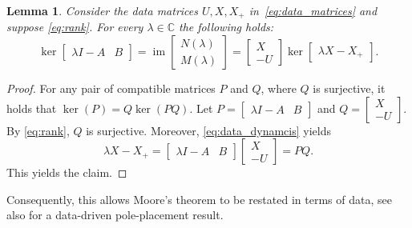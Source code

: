 \documentclass[11pt]{article}
\theoremstyle{plain}
\newtheorem{lemma}[theorem]{Lemma}
\theoremstyle{definition}
\theoremstyle{remark}
\begin{document}
\begin{lemma}
    \label{lem:data_kernel}
    Consider the data matrices $U,X,X_+$ in~\eqref{eq:data_matrices} and suppose \eqref{eq:rank}. For every $\lambda\in\mathbb C$ the following holds:
    \begin{equation}
    \label{eq:data_kernel}
        \operatorname{ker}\begin{bmatrix}
            \lambda I - A & B
        \end{bmatrix} = \operatorname{im}\begin{bmatrix} N(\lambda)\\ M(\lambda) \end{bmatrix}=  \begin{bmatrix} X\\ -U\end{bmatrix}\operatorname{ker}\begin{bmatrix}
        \lambda X-X_+\end{bmatrix}.
        \end{equation}
\end{lemma}
\begin{proof}
    For any pair of compatible matrices $P$ and $Q$, where $Q$ is surjective, it holds that $\operatorname{ker}(P) = Q\operatorname{ker}(PQ)$. Let $P = \begin{bmatrix}
        \lambda I - A & B
    \end{bmatrix}$ and $Q = [\begin{smallmatrix}X\\ -U\end{smallmatrix}]$. By \eqref{eq:rank}, $Q$ is surjective.
    Moreover, \eqref{eq:data_dynamcis} yields
    \begin{equation}
        \lambda X - X_+ = \begin{bmatrix}
            \lambda I - A & B
        \end{bmatrix}\begin{bmatrix}X\\ -U\end{bmatrix} = PQ.
    \end{equation}
    This yields the claim.
\end{proof}
Consequently, this allows Moore's theorem to be restated in terms of data, see also \cite{celi23} for a data-driven pole-placement result.
\end{document}
